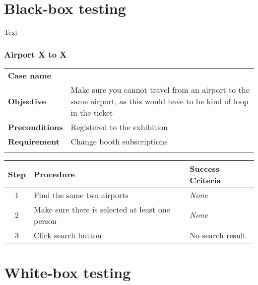 \section{Black-box testing}
Text

\subsubsection*{Airport X to X}

\begin{center}
\begin{tabular}{l p{7cm}}
\hline
\textbf{Case name} & \\
\textbf{Objective} & Make sure you cannot travel from an airport to the same airport, as this would have to be kind of loop in the ticket\\
\textbf{Preconditions} & Registered to the exhibition\\
\textbf{Requirement} & Change booth subscriptions\\
\hline
\\
\end{tabular}
\end{center}

\begin{center}
\begin{tabular}{| c | p{4.5cm} | p{4.5cm} |}
\hline
\textbf{Step} & \textbf{Procedure} & \textbf{Success Criteria}\\
\hline
1 & Find the same two airports & \textit{None}\\
\hline
2 & Make sure there is selected at least one person & \textit{None}\\
\hline
3 & Click search button & No search result\\
\hline
\end{tabular}
\end{center}


\section{White-box testing}

